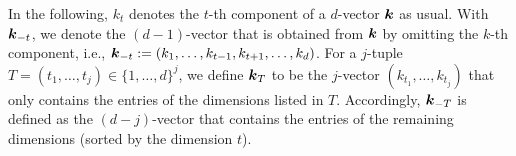 In the following, $k_t$ denotes the $t$-th component of a $d$-vector ${\boldsymbol{k}}$
as usual.
With ${\boldsymbol{k}}_{-t}$, we denote the $(d-1)$-vector that is obtained from ${\boldsymbol{k}}$
by omitting the $k$-th component,
i.e., ${\boldsymbol{k}}_{-t} := (k_1, \dotsc, k_{t-1}, k_{t+1}, \dotsc, k_d)$.
For a $j$-tuple $T = (t_1, \dotsc, t_j) \in \{1, \dotsc, d\}^j$,
we define ${\boldsymbol{k}}_T$ to be the $j$-vector $(k_{t_1}, \dotsc, k_{t_j})$
that only contains the entries of the dimensions listed in $T$.
Accordingly, ${\boldsymbol{k}}_{-T}$ is defined as the $(d-j)$-vector
that contains the entries of the remaining dimensions
(sorted by the dimension $t$).
